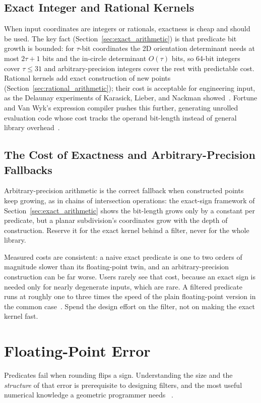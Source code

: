 \subsection{Exact Integer and Rational Kernels}
\label{sec:appimpl_integer}
When input coordinates are integers or rationals, exactness is cheap and
should be used. The key fact (Section~\ref{sec:exact_arithmetic}) is that
predicate bit growth is bounded: for $\tau$-bit coordinates the 2D
orientation determinant needs at most $2\tau+1$ bits and the in-circle
determinant $O(\tau)$ bits, so 64-bit integers cover $\tau \le 31$ and
arbitrary-precision integers cover the rest with predictable cost. Rational
kernels add exact construction of new points
(Section~\ref{sec:rational_arithmetic}); their cost is acceptable for
engineering input, as the Delaunay experiments of Karasick, Lieber, and
Nackman showed~\cite{karasick1991}. Fortune and Van Wyk's expression
compiler pushes this further, generating unrolled evaluation code whose cost
tracks the operand bit-length instead of general library
overhead~\cite{fortune1993}.
\subsection{The Cost of Exactness and Arbitrary-Precision Fallbacks}
\label{sec:appimpl_cost}
Arbitrary-precision arithmetic is the correct
fallback when constructed points keep growing, as in chains of intersection
operations: the exact-sign framework of Section~\ref{sec:exact_arithmetic}
shows the bit-length grows only by a constant per predicate, but a planar
subdivision's coordinates grow with the depth of construction. Reserve it
for the exact kernel behind a filter, never for the whole library.

Measured costs are consistent: a naive exact predicate is one to two orders
of magnitude slower than its floating-point twin, and an arbitrary-precision
construction can be far worse. Users rarely see that cost, because an
exact sign is needed only for nearly degenerate
inputs, which are rare. A filtered predicate runs at roughly one to three
times the speed of the plain floating-point version in the common
case~\cite{shewchuk1997,bronnimann2001}. Spend the design effort on the
filter, not on making the exact kernel fast.
\section{Floating-Point Error}
\label{sec:app_impl_floating_point}
Predicates fail when rounding flips a sign. Understanding the size and the
\emph{structure} of that error is prerequisite to designing filters, and
the most useful numerical knowledge a geometric programmer needs
~\cite{goldberg1991,higham2002}.
